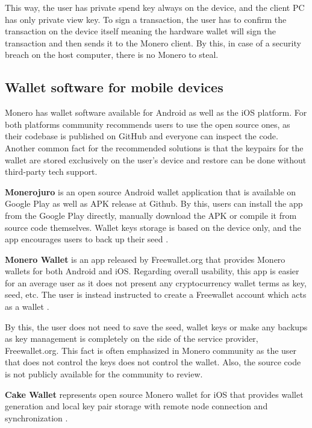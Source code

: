 \documentclass[
  printed, %
  table,   %
  lof,     %
  lot,     %
           oneside, color
]{fithesis3}
\begin{document}
This way, the user has private spend key always on the device, and the client PC has only private view key. To sign a transaction, the user has to confirm the transaction on the device itself meaning the hardware wallet will sign the transaction and then sends it to the Monero client. By this, in case of a security breach on the host computer, there is no Monero to steal.

\subsection{Wallet software for mobile devices}

Monero has wallet software available for Android as well as the iOS platform. For both platforms community recommends users to use the open source ones, as their codebase is published on GitHub and everyone can inspect the code. Another common fact for the recommended solutions is that the keypairs for the wallet are stored exclusively on the user's device and restore can be done without third-party tech support.

\textbf{Monerojuro} is an open source Android wallet application that is available on Google Play as well as APK release at Github. By this, users can install the app from the Google Play directly, manually download the APK or compile it from source code themselves. Wallet keys storage is based on the device only, and the app encourages users to back up their seed \cite{xmrwalletgithub}.

\textbf{Monero Wallet} is an app released by Freewallet.org that provides Monero wallets for both Android and iOS. Regarding overall usability, this app is easier for an average user as it does not present any cryptocurrency wallet terms as key, seed, etc. The user is instead instructed to create a Freewallet account which acts as a wallet \cite{freewallet}. 

By this, the user does not need to save the seed, wallet keys or make any backups as key management is completely on the side of the service provider, Freewallet.org. This fact is often emphasized in Monero community as the user that does not control the keys does not control the wallet. Also, the source code is not publicly available for the community to review.

\textbf{Cake Wallet} represents open source Monero wallet for iOS that provides wallet generation and local key pair storage with remote node connection and synchronization \cite{cakewalletgithub}.
\end{document}
